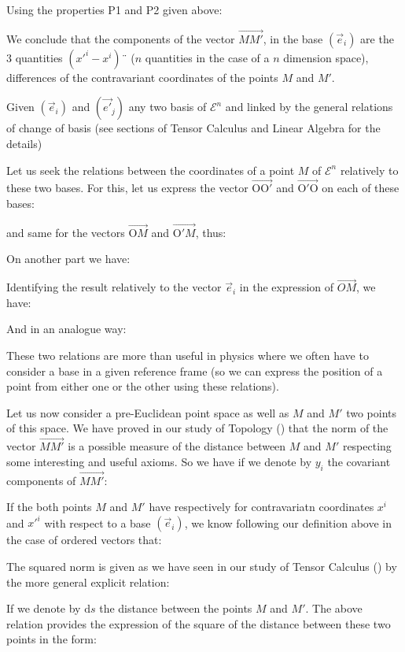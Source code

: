 	Using the properties P1 and P2 given above:
	
	We conclude that the components of the vector $\overrightarrow{MM'}$, in the base $(\vec{e}_i)$ are the $3$ quantities $({x'}^i-x^i)¨$ ($n$ quantities in the case of a $n$ dimension space), differences of the contravariant coordinates of the points $M$ and $M'$.
	
	Given $(\vec{e}_i)$ and $(\vec{e'}_j)$ any two basis of $\mathcal{E}^n$ and linked by the general relations of change of basis (see sections of Tensor Calculus and Linear Algebra for the details)
	
	Let us seek the relations between the coordinates of a point $M$ of $\mathcal{E}^n$ relatively to these two bases. For this, let us express the vector $\overrightarrow{\text{O}\text{O}'}$ and $\overrightarrow{\text{O}'\text{O}}$ on each of these bases:
	
	and same for the vectors $\overrightarrow{\text{O}M}$ and $\overrightarrow{\text{O}'M}$, thus:
	
	On another part we have:
	
	Identifying the result relatively to the vector $\vec{e}_i$ in the expression of $\overrightarrow{OM}$, we have:
	
	And in an analogue way:
	
	These two relations are more than useful in physics where we often have to consider a base in a given reference frame (so we can express the position of a point from either one or the other using these relations).

	Let us now consider a pre-Euclidean point space as well as $M$ and $M'$ two points of this space. We have proved in our study of Topology () that the norm of the vector $\overrightarrow{MM'}$ is a possible measure of the distance between $M$ and $M'$ respecting some interesting and useful axioms. So we have if we denote by $y_i$ the covariant components of $\overrightarrow{MM'}$:
	
	If the both points $M$ and $M'$ have respectively for contravariatn coordinates $x^i$ and ${x'}^i$ with respect to a base $(\vec{e}_i)$, we know following our definition above in the case of ordered vectors that:
	
	The squared norm is given as we have seen in our study of Tensor Calculus () by the more general explicit relation:
	
	If we denote by $\mathrm{d}s$ the distance between the points $M$ and $M'$. The above relation provides the expression of the square of the distance between these two points in the form:
	
